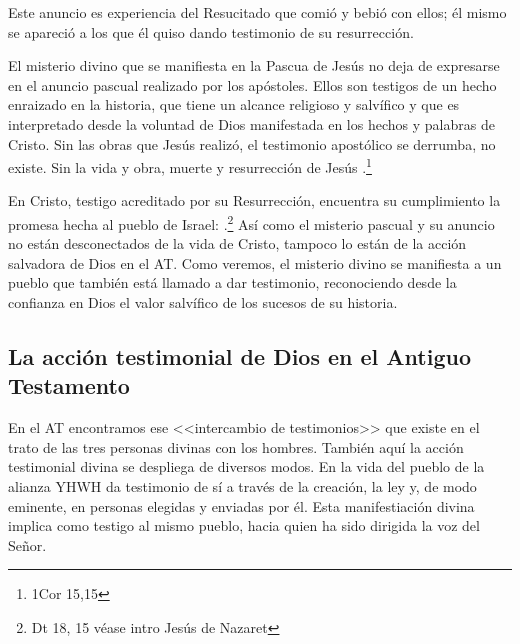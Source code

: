 Este anuncio es experiencia del Resucitado que comió y bebió con ellos;
él mismo se apareció a los que él quiso dando testimonio de su
resurrección. \autocite[129]{prades2015testimonio}

El misterio divino que se manifiesta en la Pascua de Jesús no deja de expresarse
en el anuncio pascual realizado por los apóstoles. Ellos son testigos de un
hecho enraizado en la historia, que tiene un alcance religioso y salvífico y que
es interpretado desde la voluntad de Dios manifestada en los hechos y palabras
de Cristo. Sin las obras que Jesús realizó, el testimonio apostólico se
derrumba, no existe.\autocite[Cf.][1529]{latourelle2000testimonio} Sin la vida y
obra, muerte y resurrección de Jesús .\footnote{1Cor 15,15}

En Cristo, testigo acreditado por su Resurrección, encuentra su cumplimiento
la promesa hecha al pueblo de Israel: .\footnote{Dt 18, 15 véase intro Jesús de Nazaret} Así
como el misterio pascual y su anuncio no están desconectados de la vida de
Cristo, tampoco lo están de la acción salvadora de Dios en el AT. Como veremos,
el misterio divino se manifiesta a un pueblo que también está llamado a dar
testimonio, reconociendo desde la confianza en Dios el valor salvífico de los
sucesos de su historia.



\subsection{La acción testimonial de Dios en el Antiguo Testamento}

En el AT encontramos ese <<intercambio de testimonios>> que existe en el trato
de las tres personas divinas con los
hombres.\autocite[Cf.][1531]{latourelle2000testimonio} También aquí la acción
testimonial divina se despliega de diversos modos. En la vida del pueblo de la
alianza YHWH da testimonio de sí a través de la creación, la ley y, de modo
eminente, en personas elegidas y enviadas por
él.\autocite[Cf.][114s]{prades2015testimonio} Esta manifestiación divina implica
como testigo al mismo pueblo, hacia quien ha sido dirigida la voz del Señor.


